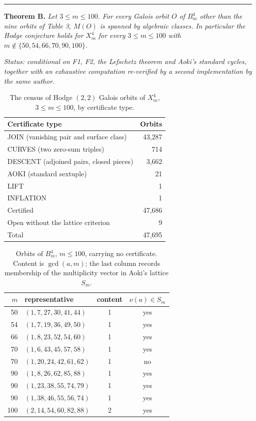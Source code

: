 \documentclass[10pt,twocolumn]{article}
\newenvironment{jbox}{\par\vspace{2pt}\noindent\color{accent}\rule{\columnwidth}{0.8pt}\par\vspace{-2pt}\small}{\par\vspace{2pt}}
\begin{document}
\begin{jbox}
\color{black}
\textbf{Theorem B.} \textit{Let $3\le m\le 100$. For every Galois orbit $O$ of $B^4_m$ other than the nine orbits of Table 3, $M(O)$ is spanned by algebraic classes. In particular the Hodge conjecture holds for $X^4_m$ for every $3\le m\le 100$ with $m\notin\{50,54,66,70,90,100\}$.}\par\smallskip
\textit{Status: conditional on F1, F2, the Lefschetz theorem and Aoki's standard cycles, together with an exhaustive computation re-verified by a second implementation by the same author.}
\end{jbox}

\begin{table}[t]
\centering\footnotesize
\caption{The census of Hodge $(2,2)$ Galois orbits of $X^4_m$, $3\le m\le 100$, by certificate type.}
\begin{tabular}{@{}lr@{}}
\toprule
Certificate type & Orbits \\
\midrule
JOIN (vanishing pair and surface class) & 43{,}287 \\
CURVES (two zero-sum triples) & 714 \\
DESCENT (adjoined pairs, closed pieces) & 3{,}662 \\
AOKI (standard sextuple) & 21 \\
LIFT & 1 \\
INFLATION & 1 \\
\midrule
Certified & 47{,}686 \\
Open without the lattice criterion & 9 \\
Total & 47{,}695 \\
\bottomrule
\end{tabular}
\end{table}

\begin{table}[t]
\centering\footnotesize
\caption{Orbits of $B^4_m$, $m\le 100$, carrying no certificate. Content is $\gcd(a,m)$; the last column records membership of the multiplicity vector in Aoki's lattice $S_m$.}
\begin{tabular}{@{}rlcc@{}}
\toprule
$m$ & representative & content & $\nu(a)\in S_m$ \\
\midrule
50 & $(1,7,27,30,41,44)$ & 1 & yes \\
54 & $(1,7,19,36,49,50)$ & 1 & yes \\
66 & $(1,8,23,52,54,60)$ & 1 & yes \\
70 & $(1,6,43,45,57,58)$ & 1 & yes \\
70 & $(1,20,24,42,61,62)$ & 1 & no \\
90 & $(1,8,26,62,85,88)$ & 1 & yes \\
90 & $(1,23,38,55,74,79)$ & 1 & yes \\
90 & $(1,38,46,55,56,74)$ & 1 & yes \\
100 & $(2,14,54,60,82,88)$ & 2 & yes \\
\bottomrule
\end{tabular}
\end{table}
\end{document}
